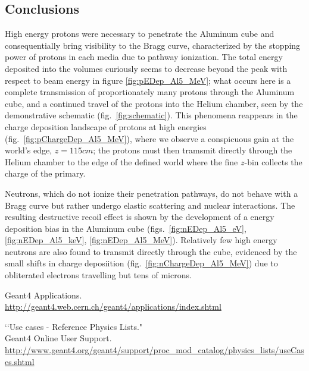 \documentclass[11pt]{article}
\begin{document}
\begin{multicols}{2}
\section{Conclusions}

High energy protons were necessary to penetrate the Aluminum cube and consequentially bring visibility to the Bragg curve, characterized by the stopping power of protons in each media due to pathway ionization.  The total energy deposited into the volumes curiously seems to decrease beyond the peak with respect to beam energy in figure \ref{fig:pEDep_Al5_MeV}; what occurs here is a complete transmission of proportionately many protons through the Aluminum cube, and a continued travel of the protons into the Helium chamber, seen by the demonstrative schematic (fig.~\ref{fig:schematic}).  This phenomena reappears in the charge deposition landscape of protons at high energies (fig.~\ref{fig:pChargeDep_Al5_MeV}), where we observe a conspicuous gain at the world's edge, $z=115cm$; the protons must then tramsmit directly through the Helium chamber to the edge of the defined world where the fine $z$-bin collects the charge of the primary.

Neutrons, which do not ionize their penetration pathways, do not behave with a Bragg curve but rather undergo elastic scattering and nuclear interactions.  The resulting destructive recoil effect is shown by the development of a energy deposition bias in the Aluminum cube (figs.~\ref{fig:nEDep_Al5_eV}, \ref{fig:nEDep_Al5_keV}, \ref{fig:nEDep_Al5_MeV}).  Relatively few high energy neutrons are also found to transmit directly through the cube, evidenced by the small shifts in charge deposiition (fig.~\ref{fig:nChargeDep_Al5_MeV}) due to obliterated electrons travelling but tens of microns.

\begin{thebibliography}{99}

Geant4 Applications. \\
\url{http://geant4.web.cern.ch/geant4/applications/index.shtml}

\lq\lq Use cases - Reference Physics Lists." \\
Geant4 Online User Support. \\
\url{http://www.geant4.org/geant4/support/proc_mod_catalog/physics_lists/useCases.shtml}
 
\end{thebibliography}
\end{multicols}
\appendix
\newpage
\end{document}
